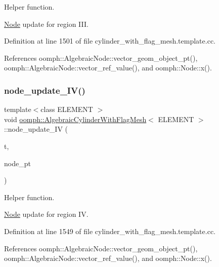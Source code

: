 Helper function. 

\hyperlink{classoomph_1_1Node}{Node} update for region I\+II. 

Definition at line 1501 of file cylinder\+\_\+with\+\_\+flag\+\_\+mesh.\+template.\+cc.



References oomph\+::\+Algebraic\+Node\+::vector\+\_\+geom\+\_\+object\+\_\+pt(), oomph\+::\+Algebraic\+Node\+::vector\+\_\+ref\+\_\+value(), and oomph\+::\+Node\+::x().

\mbox{\label{classoomph_1_1AlgebraicCylinderWithFlagMesh_a69ab465aa28dd9a65a0c50762c0a6d89}} 
\subsubsection{\texorpdfstring{node\+\_\+update\+\_\+\+I\+V()}{node\_update\_IV()}}
{\footnotesize\ttfamily template$<$class E\+L\+E\+M\+E\+NT $>$ \\
void \hyperlink{classoomph_1_1AlgebraicCylinderWithFlagMesh}{oomph\+::\+Algebraic\+Cylinder\+With\+Flag\+Mesh}$<$ E\+L\+E\+M\+E\+NT $>$\+::node\+\_\+update\+\_\+\+IV (\begin{DoxyParamCaption}\item[{const unsigned \&}]{t,  }\item[{\hyperlink{classoomph_1_1AlgebraicNode}{Algebraic\+Node} $\ast$\&}]{node\+\_\+pt }\end{DoxyParamCaption})\hspace{0.3cm}{\ttfamily [protected]}}



Helper function. 

\hyperlink{classoomph_1_1Node}{Node} update for region IV. 

Definition at line 1549 of file cylinder\+\_\+with\+\_\+flag\+\_\+mesh.\+template.\+cc.



References oomph\+::\+Algebraic\+Node\+::vector\+\_\+geom\+\_\+object\+\_\+pt(), oomph\+::\+Algebraic\+Node\+::vector\+\_\+ref\+\_\+value(), and oomph\+::\+Node\+::x().

